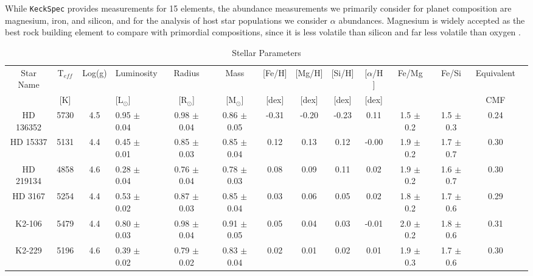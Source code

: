 \documentclass[twocolumn]{aastex631}
\begin{document}
While \texttt{KeckSpec} provides measurements for 15 elements, the abundance measurements we primarily consider for planet composition are magnesium, iron, and silicon, and for the analysis of host star populations we consider $\alpha$ abundances. Magnesium is widely accepted as the best rock building element to compare with primordial compositions, since it is less volatile than silicon and far less volatile than oxygen \citep{Yakovlev2018}.  


\begin{table}
\centering
    

\caption{Stellar Parameters}
\label{table:stellar}

\begin{tabular}{|c|c|c|h|c|c|c|c|c|C|c|c|c|c|} \hline 
 Star Name & T$_{eff}$    & Log(g)  &   Luminosity    & Radius          & Mass            & [Fe/H]  & [Mg/H] & [Si/H]  &[$\alpha$/H ] & Fe/Mg         & Fe/Si         & Equivalent \\  
           & [K]         &          & [L$_{\odot}$]   & [R$_{\odot}$]   & [M$_{\odot}$]   & [dex]   & [dex]  & [dex]   &  [dex]       &             &               & CMF \\ \hline
HD 136352  & 5730      & 4.5        & 0.95 $\pm$ 0.04 & 0.98 $\pm$ 0.04 & 0.86 $\pm$ 0.05 & -0.31   &-0.20   & -0.23   &  0.11        & 1.5 $\pm$ 0.2 & 1.5 $\pm$ 0.3 & 0.24 \\ 
HD 15337   & 5131      & 4.4        & 0.45 $\pm$ 0.01 & 0.85 $\pm$ 0.03 & 0.85 $\pm$ 0.04 & 0.12    & 0.13   & 0.12    & -0.00        & 1.9 $\pm$ 0.2 & 1.7 $\pm$ 0.7 & 0.30 \\ 
HD 219134  & 4858      & 4.6        & 0.28 $\pm$ 0.04 & 0.76 $\pm$ 0.04 & 0.78 $\pm$ 0.03 & 0.08    & 0.09   & 0.11    &  0.02        & 1.9 $\pm$ 0.2 & 1.6 $\pm$ 0.7 & 0.30 \\ 
HD 3167    & 5254      & 4.4        & 0.53 $\pm$ 0.02 & 0.87 $\pm$ 0.03 & 0.85 $\pm$ 0.04 & 0.03    & 0.06   & 0.05    &  0.02        & 1.8 $\pm$ 0.2 & 1.7 $\pm$ 0.6 & 0.29 \\ 
K2-106     & 5479      & 4.4        & 0.80 $\pm$ 0.03 & 0.98 $\pm$ 0.04 & 0.91 $\pm$ 0.05 & 0.05    & 0.04   & 0.03    &  -0.01       & 2.0 $\pm$ 0.2 & 1.8 $\pm$ 0.6 & 0.31 \\
K2-229     & 5196      & 4.6        & 0.39 $\pm$ 0.02 & 0.79 $\pm$ 0.02 & 0.83 $\pm$ 0.04 & 0.02    & 0.01   & 0.02    &  0.01        & 1.9 $\pm$ 0.3 & 1.7 $\pm$ 0.6 & 0.30 \\

\end{tabular}
\end{table}
\end{document}
